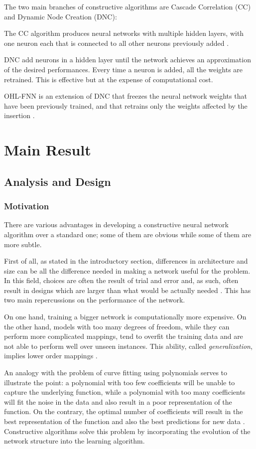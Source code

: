 \documentclass[11pt,a4paper]{report}
\begin{document}
			The two main branches of constructive algorithms are Cascade Correlation (CC) and Dynamic Node Creation (DNC):
			
			The CC algorithm produces neural networks with multiple hidden layers, with one neuron each that is connected to all other neurons previously added \cite{sharma2010constructive}.
					
			DNC add neurons in a hidden layer until the network achieves an approximation of the desired performances.
			Every time a neuron is added, all the weights are retrained. This is effective but at the expense of computational cost. \cite{sharma2010constructive}
					
			OHL-FNN is an extension of DNC that freezes the neural network weights that have been previously trained, and that retrains only the weights affected by the insertion \cite{kwok1997objective}.

	
	\chapter{Main Result}
		\section{Analysis and Design}
			\subsection{Motivation}
				There are various advantages in developing a constructive neural network algorithm over a standard one; some of them are obvious while some of them are more subtle.
				
				First of all, as stated in the introductory section, differences in architecture and size can be all the difference needed in making a network useful for the problem. In this field, choices are often the result of trial and error and, as such, often result in designs which are larger than what would be actually needed \cite{?}. This has two main repercussions on the performance of the network.
				
				On one hand, training a bigger network is computationally more expensive. On the other hand, models with too many degrees of freedom, while they can perform more complicated mappings, tend to overfit the training data and are not able to perform well over unseen instances. This ability, called \emph{generalization}, implies lower order mappings \cite{alpaydin1994gal}.
				
				An analogy with the problem of curve fitting using polynomials serves to illustrate the point: a polynomial with too few coefficients will be unable to capture the underlying function, while a polynomial with too many coefficients will fit the noise in the data and also result in a poor representation of the function. On the contrary, the optimal number of coefficients will result in the best representation of the function and also the best predictions for new data \cite{kwok1997objective}. Constructive algorithms solve this problem by incorporating the evolution of the network structure into the learning algorithm.
				
\end{document}
